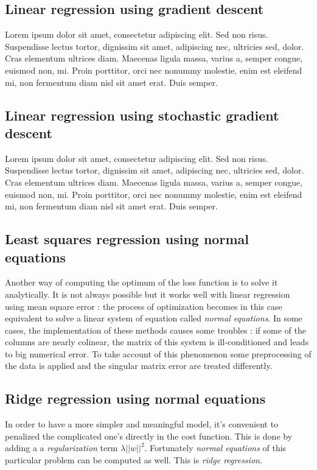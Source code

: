 \documentclass[10pt,conference,compsocconf]{IEEEtran}
\begin{document}
\subsection{Linear regression using gradient descent}
Lorem ipsum dolor sit amet, consectetur adipiscing elit. Sed non risus. Suspendisse lectus tortor, dignissim sit amet, adipiscing nec, ultricies sed, dolor. Cras elementum ultrices diam. Maecenas ligula massa, varius a, semper congue, euismod non, mi. Proin porttitor, orci nec nonummy molestie, enim est eleifend mi, non fermentum diam nisl sit amet erat. Duis semper. 

\subsection{Linear regression using stochastic gradient descent}
Lorem ipsum dolor sit amet, consectetur adipiscing elit. Sed non risus. Suspendisse lectus tortor, dignissim sit amet, adipiscing nec, ultricies sed, dolor. Cras elementum ultrices diam. Maecenas ligula massa, varius a, semper congue, euismod non, mi. Proin porttitor, orci nec nonummy molestie, enim est eleifend mi, non fermentum diam nisl sit amet erat. Duis semper. 

\subsection{Least squares regression using normal equations}
Another way of computing the optimum of the loss function is to solve it analytically. It is not always possible but it works well with linear regression using mean square error : the process of optimization becomes in this case equivalent to solve a linear system of equation called \textit{normal equations}. In some cases, the implementation of these methods causes some troubles : if some of the columns are nearly colinear, the matrix of this system is ill-conditioned and leads to big numerical error. To take account of this phenomenon some preprocessing of the data is applied and the singular matrix error are treated differently. 

\subsection{Ridge regression using normal equations}
In order to have a more simpler and meaningful model, it's convenient to penalized the complicated one's directly in the cost function. This is done by adding a a \textit{regularization} term $\lambda \vert\vert w \vert\vert ^2$. Fortunately \textit{normal equations} of this particular problem can be computed as well. This is \textit{ridge regression}.
\end{document}
